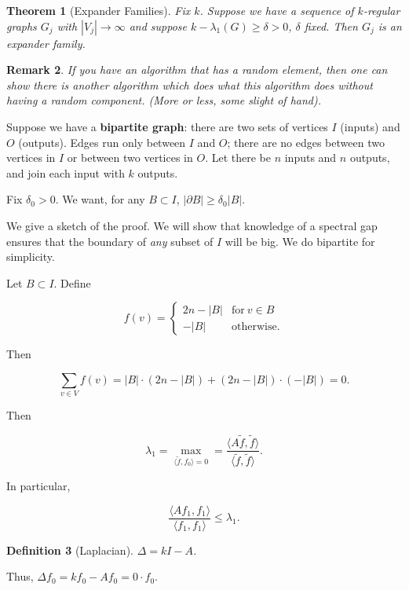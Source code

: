 \documentclass[12pt,letterpaper]{report}
\newcommand\be{\begin{equation}}
\newcommand\ee{\end{equation}}
\newtheorem{thm}{Theorem}[section]
\newtheorem{defi}[thm]{Definition}
\newtheorem{rek}[thm]{Remark}
\begin{document}
\begin{thm}[Expander Families]
Fix $k$. Suppose we have a sequence of $k$-regular graphs $G_j$
with $|V_j| \rightarrow \infty$ and suppose $k - \lambda_1(G) \ge
\delta > 0$, $\delta$ fixed. Then $G_j$ is an expander family.
\end{thm}

\begin{rek}If you have an algorithm that has a random element, then one
can show there is another algorithm which does what this algorithm
does without having a random component. (More or less, some slight
of hand). \end{rek}

Suppose we have a \textbf{bipartite graph}: there are two sets of
vertices $I$ (inputs) and $O$ (outputs). Edges run only between
$I$ and $O$; there are no edges between two vertices in $I$ or
between two vertices in $O$. Let there be $n$ inputs and $n$
outputs, and join each input with $k$ outputs.

Fix $\delta_0 > 0$. We want, for any $B \subset I$, $|\partial B|
\ge \delta_0 |B|$.

We give a sketch of the proof. We will show that knowledge of a
spectral gap ensures that the boundary of \emph{any} subset of $I$
will be big. We do bipartite for simplicity.

Let $B \subset I$. Define

\be f(v) = \begin{cases} 2n - |B| & \mbox{for} \ v \in B \\ -|B| &
\mbox{otherwise}.
\end{cases} \ee

Then

\be \sum_{v \in V} f(v) = |B| \cdot (2n - |B|) + (2n - |B|) \cdot
(-|B|) = 0. \ee

Then

\be \lambda_1 = \max_{ \langle \tilde{f},f_0 \rangle = 0 } =
\frac{ \langle A \tilde{f}, \tilde{f} \rangle }{ \langle
\tilde{f}, \tilde{f}\rangle }. \ee

In particular,

\be \frac{ \langle Af_1, f_1 \rangle }{ \langle f_1, f_1 \rangle }
\le \lambda_1. \ee

\begin{defi}[Laplacian] $\Delta = kI - A$.
\end{defi}

Thus, $\Delta f_0 = k f_0 - Af_0 = 0 \cdot f_0$.
\end{document}
